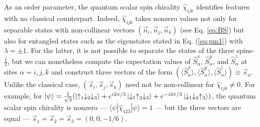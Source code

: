 \documentclass[aps,prl,twocolumn]{revtex4}
\newcommand{\bluemark}[1]{\color{blue}\textbf{#1}\color{black}}
\begin{document}
As an order parameter, the quantum scalar spin chirality $\hat{\chi}_{ijk}$ identifies features with no classical counterpart. Indeed, $\hat{\chi}_{ijk}$ takes nonzero values not only for separable states with non-collinear vectors $(\vec{n}_i, \vec{n}_j, \vec{n}_k)$ (see Eq. \ref{eq:BS}) %
but also for entangled states such as the eigenstates stated in Eq. (\ref{eq:pm1}) with $\lambda = \pm 1$. For the latter, it is not possible to separate the states of the three spins-$\frac{1}{2}$, but we can nonetheless compute the expectation values of $\hat{S}^{x}_{\alpha}$, $\hat{S}^{y}_{\alpha}$, and $\hat{S}^{z}_{\alpha}$ at sites $\alpha = i, j, k$ and construct three vectors of the form $(\langle \hat{S}^{x}_{\alpha} \rangle, \langle \hat{S}^{y}_{\alpha} \rangle, \langle \hat{S}^{z}_{\alpha} \rangle) \equiv \vec{s}_{\alpha}$. Unlike the classical case, $(\vec{s}_i, \vec{s}_j, \vec{s}_k)$ need not be non-collinear for $\hat{\chi}_{ijk} \neq 0$. For example, for $\ket{\psi} = \frac{1}{\sqrt{3}}(\ket{\uparrow_1 \downarrow_2 \downarrow_3} + e^{i 2\pi/3} \ket{\downarrow_1 \uparrow_2 \downarrow_3} + e^{-i 2\pi/3} \ket{\downarrow_1 \downarrow_2 \uparrow_3})$, the quantum scalar spin chirality is nonzero --- $\langle \psi | \hat{\chi}_{123} | \psi \rangle = 1$ --- but the three vectors are equal --- $\vec{s}_{1} = \vec{s}_{2} = \vec{s}_{3} = (0,0,-1/6)$.  %

\end{document}
